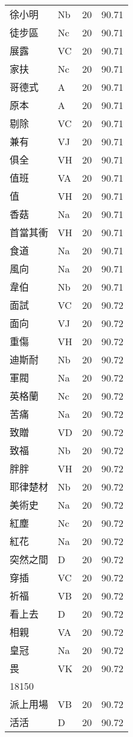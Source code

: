 \documentclass[twocolumn]{book}
\begin{document}
\begin{supertabular}{llrr}
徐小明 & Nb & 20 &  90.71\\
徒步區 & Nc & 20 &  90.71\\
展露 & VC & 20 &  90.71\\
家扶 & Nc & 20 &  90.71\\
哥德式 & A & 20 &  90.71\\
原本 & A & 20 &  90.71\\
剔除 & VC & 20 &  90.71\\
兼有 & VJ & 20 &  90.71\\
俱全 & VH & 20 &  90.71\\
值班 & VA & 20 &  90.71\\
值 & VH & 20 &  90.71\\
香菇 & Na & 20 &  90.71\\
首當其衝 & VH & 20 &  90.71\\
食道 & Na & 20 &  90.71\\
風向 & Na & 20 &  90.71\\
韋伯 & Nb & 20 &  90.71\\
面試 & VC & 20 &  90.72\\
面向 & VJ & 20 &  90.72\\
重傷 & VH & 20 &  90.72\\
迪斯耐 & Nb & 20 &  90.72\\
軍閥 & Na & 20 &  90.72\\
英格蘭 & Nc & 20 &  90.72\\
苦痛 & Na & 20 &  90.72\\
致贈 & VD & 20 &  90.72\\
致福 & Nb & 20 &  90.72\\
胖胖 & VH & 20 &  90.72\\
耶律楚材 & Nb & 20 &  90.72\\
美術史 & Na & 20 &  90.72\\
紅塵 & Nc & 20 &  90.72\\
紅花 & Na & 20 &  90.72\\
突然之間 & D & 20 &  90.72\\
穿插 & VC & 20 &  90.72\\
祈福 & VB & 20 &  90.72\\
看上去 & D & 20 &  90.72\\
相親 & VA & 20 &  90.72\\
皇冠 & Na & 20 &  90.72\\
畏 & VK & 20 &  90.72\\
18150\\
派上用場 & VB & 20 &  90.72\\
活活 & D & 20 &  90.72\\

\end{supertabular}
\end{document}
